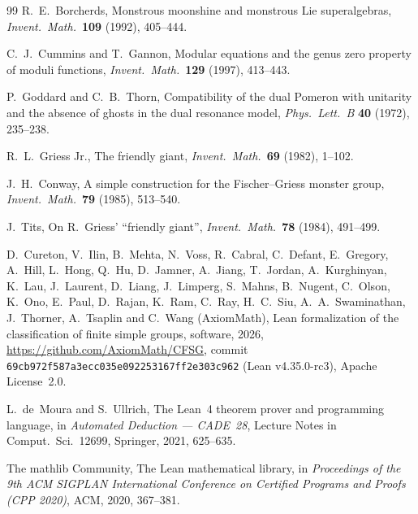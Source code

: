\documentclass[10pt]{article}
\begin{document}
\begin{thebibliography}{99}
  R.~E.~Borcherds, Monstrous moonshine and monstrous Lie superalgebras, \emph{Invent.\ Math.}\ \textbf{109} (1992),
  405--444.

  C.~J.~Cummins and T.~Gannon, Modular equations and the genus zero property of moduli functions, \emph{Invent.\
  Math.}\ \textbf{129} (1997), 413--443.

  P.~Goddard and C.~B.~Thorn, Compatibility of the dual Pomeron with unitarity and the absence of ghosts in the dual
  resonance model, \emph{Phys.\ Lett.\ B} \textbf{40} (1972), 235--238.

  R.~L.~Griess Jr., The friendly giant, \emph{Invent.\ Math.}\ \textbf{69} (1982), 1--102.

  J.~H.~Conway, A simple construction for the Fischer--Griess monster group, \emph{Invent.\ Math.}\ \textbf{79}
  (1985), 513--540.

  J.~Tits, On R.~Griess' ``friendly giant'', \emph{Invent.\ Math.}\ \textbf{78} (1984), 491--499.

  D.~Cureton, V.~Ilin, B.~Mehta, N.~Voss, R.~Cabral, C.~Defant, E.~Gregory, A.~Hill, L.~Hong, Q.~Hu, D.~Jamner,
  A.~Jiang, T.~Jordan, A.~Kurghinyan, K.~Lau, J.~Laurent, D.~Liang, J.~Limperg, S.~Mahns, B.~Nugent, C.~Olson, K.~Ono,
  E.~Paul, D.~Rajan, K.~Ram, C.~Ray, H.~C.~Siu, A.~A.~Swaminathan, J.~Thorner, A.~Tsaplin and C.~Wang (AxiomMath),
  Lean formalization of the classification of finite simple groups, software, 2026,
  \url{https://github.com/AxiomMath/CFSG}, commit \texttt{69cb972f587a3ecc035e092253167ff2e303c962} (Lean
  v4.35.0-rc3), Apache License~2.0.

  L.~de~Moura and S.~Ullrich, The Lean~4 theorem prover and programming language, in \emph{Automated Deduction ---
  CADE~28}, Lecture Notes in Comput.\ Sci.~12699, Springer, 2021, 625--635.

  The mathlib Community, The Lean mathematical library, in \emph{Proceedings of the 9th ACM SIGPLAN International
  Conference on Certified Programs and Proofs (CPP 2020)}, ACM, 2020, 367--381.

\end{thebibliography}
\end{document}
